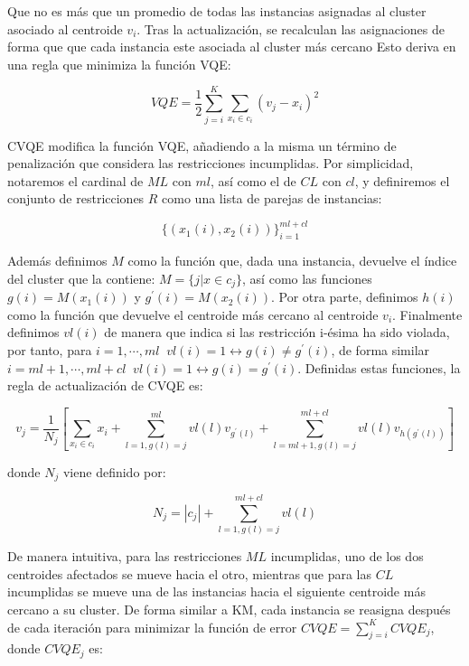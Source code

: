 Que no es más que un promedio de todas las instancias asignadas al cluster asociado al centroide $v_i$. Tras la actualización, se recalculan las asignaciones de forma que que cada instancia este asociada al cluster más cercano Esto deriva en una regla que minimiza la función \acf{VQE}:

\begin{equation}
VQE = \frac{1}{2} \sum_{j = i}^{K} \sum_{x_i \in c_i} (v_j - x_i)^2
\label{eqn28}
\end{equation}

\acs{CVQE} modifica la función \acs{VQE}, añadiendo a la misma un término de penalización que considera las restricciones incumplidas. Por simplicidad, notaremos el cardinal de $ML$ con $ml$, así como el de $CL$ con $cl$, y definiremos el conjunto de restricciones $R$ como una lista de parejas de instancias: 

\begin{equation}
\{(x_1(i), x_2(i))\}_{i=1}^{ml+cl}
\label{eqn29}
\end{equation}

Además definimos $M$ como la función que, dada una instancia, devuelve el índice del cluster que la contiene: $M = \{j | x \in c_j\}$, así como las funciones $g(i) = M(x_1(i))$ y $g^\prime(i) = M(x_2(i))$. Por otra parte, definimos $h(i)$ como la función que devuelve el centroide más cercano al centroide $v_i$. Finalmente definimos $vl(i)$ de manera que indica si las restricción i-ésima ha sido violada, por tanto, para $i = 1, \cdots , ml \;\; vl(i) = 1 \leftrightarrow g(i) \neq g^\prime(i)$, de forma similar $i = ml + 1, \cdots , ml + cl \;\; vl(i) = 1 \leftrightarrow g(i) = g^\prime(i)$. Definidas estas funciones, la regla de actualización de \acs{CVQE} es:

\begin{equation}
v_j = \frac{1}{N_j} \left[ \sum_{x_i \in c_i}x_i + 
\sum_{l=1,g(l) = j}^{ml} vl(l) v_{g^\prime(l)} + 
\sum_{l=ml + 1,g(l) = j}^{ml + cl} vl(l) v_{h(g^\prime(l))}
\right]
\label{eqn30}
\end{equation}

donde $N_j$ viene definido por: 

\begin{equation}
N_j = |c_j| + \sum_{l=1,g(l) = j}^{ml + cl} vl(l)
\label{eqn31}
\end{equation}

De manera intuitiva, para las restricciones $ML$ incumplidas, uno de los dos centroides afectados se mueve hacia el otro, mientras que para las $CL$ incumplidas se mueve una de las instancias hacia el siguiente centroide más cercano a su cluster. De forma similar a \acs{KM}, cada instancia se reasigna después de cada iteración para minimizar la función de error $CVQE = \sum_{j=i}^{K} CVQE_j$, donde $CVQE_j$ es:

